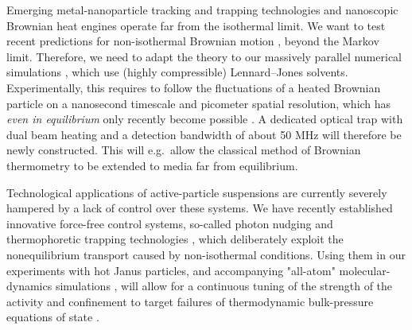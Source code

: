 \begin{workpackage}[id=WPactive,wphases=0-48,
  short=Active Particle Suspensions,%
  title=Probing active particle suspensions with colloids and polymers,
  lead=ULEI,
  ULEIRM=96,UNIPDRM=6,USTUTTRM=2]
\begin{tasklist}
\begin{task}[title=Active Crowding,id=task2,lead=ULEI,partners={KUL},wphases=0-48!0.5]
\end{task}


\begin{task}[title=Noise Temperature,id=task3,lead=ULEI,wphases=0-24!0.5]
Emerging metal-nanoparticle tracking and trapping technologies and nanoscopic Brownian heat engines
operate far from the isothermal limit.
We want to test recent predictions for non-isothermal Brownian motion \cite{rings-etal:2010,falasco-etal:2014}, 
beyond the Markov limit. Therefore, we need to adapt the theory 
to our massively parallel numerical simulations \cite{chakraborty-etal:2011}, 
which use (highly compressible) Lennard--Jones solvents.
Experimentally, this requires to follow the fluctuations of 
a heated Brownian particle on a nanosecond timescale and picometer spatial resolution, which has
\emph{even in equilibrium} only recently become possible  \cite{kheifets-etal:2014}.
%
A dedicated optical trap with dual beam heating and a detection bandwidth of about 50 MHz
will therefore be newly constructed. 
%
This will e.g.\ allow the classical method of Brownian thermometry to be extended to media far from equilibrium.
\end{task}

\begin{task}[title=Active-Particle Suspensions,id=task4,lead=ULEI,wphases=24-48!0.5]
Technological applications of active-particle suspensions  are
currently severely hampered by a lack of control over these systems.
%
We have recently established innovative force-free control systems, so-called photon nudging
and thermophoretic trapping technologies \cite{Qian2013,Braun:NanoLetters:2015}, which deliberately exploit 
the nonequilibrium transport caused by non-isothermal conditions.
%
Using them in our experiments with hot Janus particles, and accompanying "all-atom" molecular-dynamics 
simulations \cite{chakraborty-etal:2011}, will allow for a continuous tuning of the strength of 
the activity and confinement to target failures of thermodynamic bulk-pressure equations of
state \cite{ginot-etal:2015}.
\end{task}


\end{tasklist}

\printbibliography[heading=proposal-bib,env=proposal-env]


\end{workpackage}
